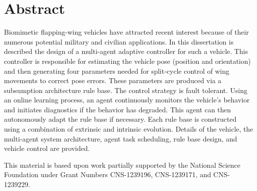 \thispagestyle{empty}
\setcounter{page}{1}
\chapter*{Abstract}
\setcounter{page}{1}
\doublespacing
Biomimetic flapping-wing vehicles have attracted recent interest because of their numerous potential military and civilian applications. In this dissertation is described the design of a multi-agent adaptive controller for such a vehicle. This controller is responsible for estimating the vehicle pose (position and orientation) and then generating four parameters needed for split-cycle control of wing movements to correct pose errors. These parameters are produced via a subsumption architecture rule base. The control strategy is fault tolerant. Using an online learning process, an agent continuously monitors the vehicle's behavior and initiates diagnostics if the behavior has degraded. This agent can then autonomously adapt the rule base if necessary. Each rule base is constructed using a combination of extrinsic and intrinsic evolution. Details of the vehicle, the multi-agent system architecture, agent task scheduling, rule base design, and vehicle control are provided.

This material is based upon work partially supported by the National Science Foundation under Grant Numbers CNS-1239196, CNS-1239171, and CNS-1239229.